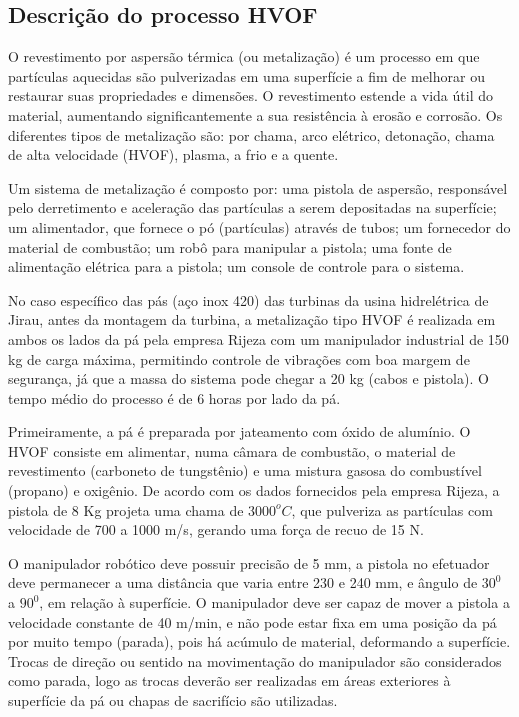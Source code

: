 \subsection{Descrição do processo HVOF}\label{sec::desc_hvof}
O revestimento por aspersão térmica (ou metalização) é um processo em que
partículas aquecidas são pulverizadas em uma superfície a fim de melhorar ou
restaurar suas propriedades e dimensões. O revestimento estende a vida útil do
material, aumentando significantemente a sua resistência à erosão e corrosão.
Os diferentes tipos de metalização são: por chama, arco elétrico, detonação,
chama de alta velocidade (HVOF), plasma, a frio e a quente.

Um sistema de metalização é composto por: uma pistola de aspersão, responsável
pelo derretimento e aceleração das partículas a serem depositadas na
superfície; um alimentador, que fornece o pó (partículas) através de tubos;
um fornecedor do material de combustão; um robô para manipular a pistola; uma
fonte de alimentação elétrica para a pistola; um console de controle para o
sistema.

No caso específico das pás (aço inox 420) das turbinas da usina hidrelétrica de
Jirau, antes da montagem da turbina, a metalização tipo HVOF é realizada em
ambos os lados da pá pela empresa Rijeza com um manipulador industrial de 150 kg
de carga máxima, permitindo controle de vibrações com boa margem de segurança, já que a massa do
sistema pode chegar a 20 kg (cabos e pistola). O tempo
médio do processo é de 6 horas por lado da pá.

Primeiramente, a pá é preparada por jateamento com óxido de alumínio. O HVOF
consiste em alimentar, numa câmara de combustão, o material de revestimento
(carboneto de tungstênio) e uma mistura gasosa do combustível (propano) e
oxigênio. De acordo com os dados fornecidos pela empresa Rijeza, a pistola de 8
Kg projeta uma chama de $3000^oC$, que pulveriza as partículas com velocidade de
700 a 1000 m/s, gerando uma força de recuo de 15 N.

O manipulador robótico deve possuir precisão de 5 mm, a pistola no efetuador
deve permanecer a uma distância que varia entre 230 e 240 mm, e ângulo de $30^0$
a $90^0$, em relação à superfície. O manipulador deve ser capaz de mover a
pistola a velocidade constante de 40 m/min, e não pode estar fixa em uma posição
da pá por muito tempo (parada), pois há acúmulo de material, deformando a
superfície. Trocas de direção ou sentido na movimentação do manipulador são
considerados como parada, logo as trocas deverão ser realizadas em áreas
exteriores à superfície da pá ou chapas de sacrifício são utilizadas. 

